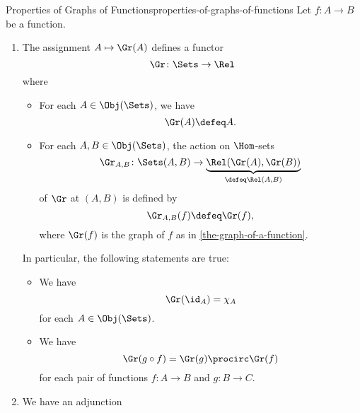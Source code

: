 \begin{proposition}{Properties of Graphs of Functions}{properties-of-graphs-of-functions}%
    Let $f\colon A\to B$ be a function.
    \begin{enumerate}
        \item\label{properties-of-graphs-of-functions-functoriality}The assignment $A\mapsto\Gr(A)$ defines a functor
            \[
                \Gr%
                \colon%
                \Sets%
                \to%
                \Rel%
            \]%
            where
            \begin{itemize}
                \item{}For each $A\in\Obj(\Sets)$, we have
                    \[
                        \Gr(A)%
                        \defeq
                        A.
                    \]%
                \item{}For each $A,B\in\Obj(\Sets)$, the action on $\Hom$-sets
                    \[
                        \Gr_{A,B}%
                        \colon%
                        \Sets(A,B)
                        \to
                        \underbrace{\Rel(\Gr(A),\Gr(B))}_{\defeq\Rel(A,B)}%
                    \]%
                    of $\Gr$ at $(A,B)$ is defined by
                    \[
                        \Gr_{A,B}(f)
                        \defeq
                        \Gr(f),
                    \]%
                    where $\Gr(f)$ is the graph of $f$ as in \cref{the-graph-of-a-function}.
            \end{itemize}
            In particular, the following statements are true:
            \begin{itemize}
                \item{}We have
                    \[
                        \Gr(\id_{A})%
                        =%
                        \chi_{A}%
                    \]%
                    for each $A\in\Obj(\Sets)$.
                \item{}We have
                    \[
                        \Gr(g\circ f)%
                        =%
                        \Gr(g)\procirc\Gr(f)%
                    \]%
                    for each pair of functions $f\colon A\to B$ and $g\colon B\to C$.
            \end{itemize}
        \item\label{properties-of-graphs-of-functions-adjointness}We have an adjunction

\end{enumerate}
\end{proposition}
